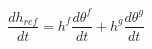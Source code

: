 \begin{equation}
\frac{dh_{ref}}{dt} = h^f \frac{d\theta^f }{dt} + h^g \frac{d\theta^g }{dt}
\end{equation}
